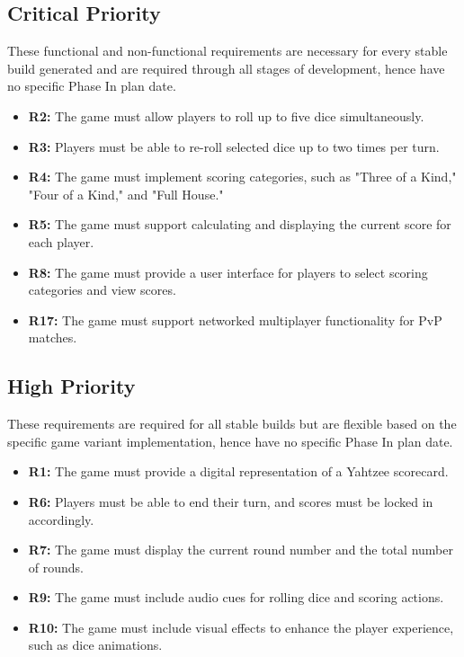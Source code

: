 \subsection{Critical Priority}
These functional and non-functional requirements are necessary for every stable build generated and are required through all stages of development, hence have no specific Phase In plan date.
\begin{itemize}
    \item \textbf{R2:} The game must allow players to roll up to five dice simultaneously.
    \item \textbf{R3:} Players must be able to re-roll selected dice up to two times per turn.
    \item \textbf{R4:} The game must implement scoring categories, such as "Three of a Kind," "Four of a Kind," and "Full House."
    \item \textbf{R5:} The game must support calculating and displaying the current score for each player.
    \item \textbf{R8:} The game must provide a user interface for players to select scoring categories and view scores.
    \item \textbf{R17:} The game must support networked multiplayer functionality for PvP matches.
\end{itemize}

\subsection{High Priority}
These requirements are required for all stable builds but are flexible based on the specific game variant implementation, hence have no specific Phase In plan date.
\begin{itemize}
    \item \textbf{R1:} The game must provide a digital representation of a Yahtzee scorecard.
    \item \textbf{R6:} Players must be able to end their turn, and scores must be locked in accordingly.
    \item \textbf{R7:} The game must display the current round number and the total number of rounds.
    \item \textbf{R9:} The game must include audio cues for rolling dice and scoring actions.
    \item \textbf{R10:} The game must include visual effects to enhance the player experience, such as dice animations.
\end{itemize}

